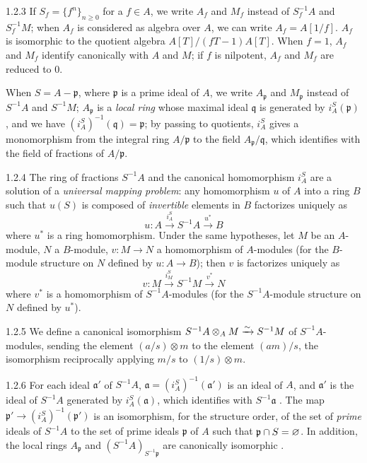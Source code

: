 \begin{env}{1.2.3}
\label{env-0.1.2.3}
If $S_f=\{f^n\}_{n\geqslant 0}$ for a $f\in A$, we write $A_f$ and $M_f$ instead of
$S_f^{-1}A$ and $S_f^{-1}M$; when $A_f$ is considered as algebra over $A$, we can write
$A_f=A[1/f]$. $A_f$ is isomorphic to the quotient algebra $A[T]/(fT-1)A[T]$. When $f=1$,
$A_f$ and $M_f$ identify canonically with $A$ and $M$; if $f$ is nilpotent, $A_f$ and $M_f$
are reduced to $0$.

When $S=A-\mathfrak{p}$, where $\mathfrak{p}$ is a prime ideal of $A$, we
write $A_\mathfrak{p}$ and $M_\mathfrak{p}$ instead of $S^{-1}A$ and $S^{-1}M$;
$A_\mathfrak{p}$ is a \emph{local ring} whose maximal ideal $\mathfrak{q}$ is generated by
$i_A^S(\mathfrak{p})$, and we have $(i_A^S)^{-1}(\mathfrak{q})=\mathfrak{p}$; by passing to
quotients, $i_A^S$ gives a monomorphism from the integral ring $A/\mathfrak{p}$ to the
field $A_\mathfrak{p}/\mathfrak{q}$, which identifies with the field of fractions of
$A/\mathfrak{p}$.
\end{env}

\begin{env}{1.2.4}
\label{env-0.1.2.4}
The ring of fractions $S^{-1}A$ and the canonical homomorphism $i_A^S$ are a solution of a \emph{universal mapping problem}:
any homomorphism $u$ of $A$ into a ring $B$ such that $u(S)$ is composed of \emph{invertible} elements in $B$ factorizes uniquely as
\[
  u:A\xrightarrow{i_A^S}S^{-1}A\xrightarrow{u^*}B
\]
where $u^*$ is a ring homomorphism. Under the same hypotheses, let $M$ be an $A$-module, $N$
a $B$-module, $v:M\to N$ a homomorphism of $A$-modules (for the $B$-module structure on $N$
defined by $u:A\to B$); then $v$ is factorizes uniquely as
\[
  v:M\xrightarrow{i_M^S}S^{-1}M\xrightarrow{v^*}N
\]
where $v^*$ is a homomorphism of $S^{-1}A$-modules (for the $S^{-1}A$-module structure on $N$
defined by $u^*$).
\end{env}

\begin{env}{1.2.5}
\label{env-0.1.2.5}
We define a canonical isomorphism $S^{-1}A\otimes_A M\xrightarrow{\sim} S^{-1}M$ of
$S^{-1}A$-modules, sending the element $(a/s)\otimes m$ to the element $(am)/s$, the
isomorphism reciprocally applying $m/s$ to $(1/s)\otimes m$.
\end{env}

\begin{env}{1.2.6}
\label{env-0.1.2.6}
For each ideal $\mathfrak{a}'$ of $S^{-1}A$, $\mathfrak{a}=(i_A^S)^{-1}(\mathfrak{a}')$ is an
ideal of $A$, and $\mathfrak{a}'$ is the ideal of $S^{-1}A$ generated by
$i_A^S(\mathfrak{a})$, which identifies with $S^{-1}\mathfrak{a}$ . The map
$\mathfrak{p}'\to(i_A^S)^{-1}(\mathfrak{p}')$ is an isomorphism, for the structure order, of
the set of \emph{prime} ideals of $S^{-1}A$ to the set of prime ideals $\mathfrak{p}$ of $A$
such that $\mathfrak{p}\cap S=\varnothing$. In addition, the local rings $A_\mathfrak{p}$ and
$(S^{-1}A)_{S^{-1}\mathfrak{p}}$ are canonically isomorphic .
\end{env}

